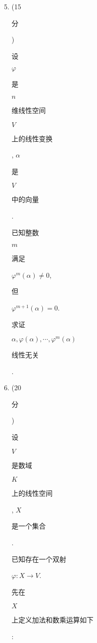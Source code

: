 \documentclass[10pt]{article}
\begin{document}
\begin{enumerate}
  \setcounter{enumi}{4}
  \item (15 \begin{CJK}{UTF8}{mj}分\end{CJK}) \begin{CJK}{UTF8}{mj}设\end{CJK} $\varphi$ \begin{CJK}{UTF8}{mj}是\end{CJK} $n$ \begin{CJK}{UTF8}{mj}维线性空间\end{CJK} $V$ \begin{CJK}{UTF8}{mj}上的线性变换\end{CJK}, $\alpha$ \begin{CJK}{UTF8}{mj}是\end{CJK} $V$ \begin{CJK}{UTF8}{mj}中的向量\end{CJK}. \begin{CJK}{UTF8}{mj}已知整数\end{CJK} $m$ \begin{CJK}{UTF8}{mj}满足\end{CJK} $\varphi^{m}(\alpha) \neq 0$, \begin{CJK}{UTF8}{mj}但\end{CJK} $\varphi^{m+1}(\alpha)=0$. \begin{CJK}{UTF8}{mj}求证\end{CJK} $\alpha, \varphi(\alpha), \cdots, \varphi^{m}(\alpha)$ \begin{CJK}{UTF8}{mj}线性无关\end{CJK}.

  \item (20 \begin{CJK}{UTF8}{mj}分\end{CJK}) \begin{CJK}{UTF8}{mj}设\end{CJK} $V$ \begin{CJK}{UTF8}{mj}是数域\end{CJK} $K$ \begin{CJK}{UTF8}{mj}上的线性空间\end{CJK}, $X$ \begin{CJK}{UTF8}{mj}是一个集合\end{CJK}. \begin{CJK}{UTF8}{mj}已知存在一个双射\end{CJK} $\varphi: X \rightarrow V$. \begin{CJK}{UTF8}{mj}先在\end{CJK} $X$ \begin{CJK}{UTF8}{mj}上定义加法和数乘运算如下\end{CJK}:

\end{enumerate}
\end{document}
